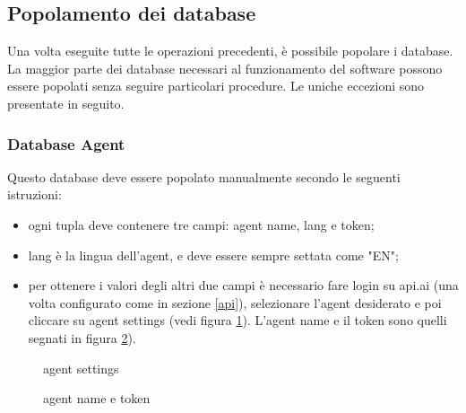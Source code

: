\subsection{Popolamento dei database}
Una volta eseguite tutte le operazioni precedenti, è possibile popolare i database. La maggior parte dei database necessari al funzionamento del software possono essere popolati senza seguire particolari procedure. Le uniche eccezioni sono presentate in seguito.

\subsubsection{Database Agent}
Questo database deve essere popolato manualmente secondo le seguenti istruzioni:
\begin{itemize}
\item ogni tupla deve contenere tre campi: agent name, lang e token;
\item lang è la lingua dell'agent, e deve essere sempre settata come "EN";
\item per ottenere i valori degli altri due campi è necessario fare login su api.ai (una volta configurato come in sezione \ref{api}), selezionare l'agent desiderato e poi cliccare su agent settings (vedi figura \ref{fig:Agent-Settings}). L'agent name e il token sono quelli segnati in figura \ref{fig:Agent-Token}).
\end{itemize}
\begin{figure}[H]
	\caption{agent settings}\label{fig:Agent-Settings}
\end{figure}

\begin{figure}[H]
	\caption{agent name e token}\label{fig:Agent-Token}
\end{figure}

